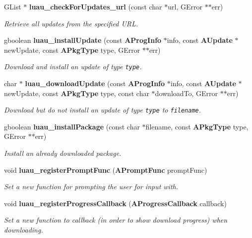 \begin{CompactItemize}
GList $\ast$ {\bf luau\_\-check\-For\-Updates\_\-url} (const char $\ast$url, GError $\ast$$\ast$err)
\begin{CompactList}\small\item\em Retrieve all updates from the specified URL. \item\end{CompactList}\item 
gboolean {\bf luau\_\-install\-Update} (const {\bf AProg\-Info} $\ast$info, const {\bf AUpdate} $\ast$new\-Update, const {\bf APkg\-Type} type, GError $\ast$$\ast$err)
\begin{CompactList}\small\item\em Download and install an update of type {\tt type}. \item\end{CompactList}\item 
char $\ast$ {\bf luau\_\-download\-Update} (const {\bf AProg\-Info} $\ast$info, const {\bf AUpdate} $\ast$new\-Update, const {\bf APkg\-Type} type, const char $\ast$download\-To, GError $\ast$$\ast$err)
\begin{CompactList}\small\item\em Download but do not install an update of type {\tt type} to {\tt filename}. \item\end{CompactList}\item 
gboolean {\bf luau\_\-install\-Package} (const char $\ast$filename, const {\bf APkg\-Type} type, GError $\ast$$\ast$err)
\begin{CompactList}\small\item\em Install an already downloaded package. \item\end{CompactList}\item 
void {\bf luau\_\-register\-Prompt\-Func} ({\bf APrompt\-Func} prompt\-Func)
\begin{CompactList}\small\item\em Set a new function for prompting the user for input with. \item\end{CompactList}\item 
void {\bf luau\_\-register\-Progress\-Callback} ({\bf AProgress\-Callback} callback)
\begin{CompactList}\small\item\em Set a new function to callback (in order to show download progress) when downloading. \item\end{CompactList}\item 

\end{CompactItemize}
